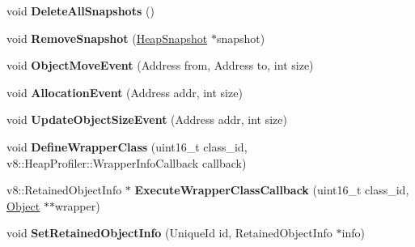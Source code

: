\begin{DoxyCompactItemize}
\item 
\hypertarget{classv8_1_1internal_1_1_heap_profiler_a95d369db8e294e4eb4d8e931d1eebf8e}{}void {\bfseries Delete\+All\+Snapshots} ()\label{classv8_1_1internal_1_1_heap_profiler_a95d369db8e294e4eb4d8e931d1eebf8e}

\item 
\hypertarget{classv8_1_1internal_1_1_heap_profiler_abe0002601a7d13e03bf48713b7e2d3a0}{}void {\bfseries Remove\+Snapshot} (\hyperlink{classv8_1_1internal_1_1_heap_snapshot}{Heap\+Snapshot} $\ast$snapshot)\label{classv8_1_1internal_1_1_heap_profiler_abe0002601a7d13e03bf48713b7e2d3a0}

\item 
\hypertarget{classv8_1_1internal_1_1_heap_profiler_aef6308a35e96bc89e13295b9f08124f4}{}void {\bfseries Object\+Move\+Event} (Address from, Address to, int size)\label{classv8_1_1internal_1_1_heap_profiler_aef6308a35e96bc89e13295b9f08124f4}

\item 
\hypertarget{classv8_1_1internal_1_1_heap_profiler_a5466f54a13dc18ab7e90d41fccd5ef2b}{}void {\bfseries Allocation\+Event} (Address addr, int size)\label{classv8_1_1internal_1_1_heap_profiler_a5466f54a13dc18ab7e90d41fccd5ef2b}

\item 
\hypertarget{classv8_1_1internal_1_1_heap_profiler_afbf0ad802eff44e4d4574a75f4aec2a5}{}void {\bfseries Update\+Object\+Size\+Event} (Address addr, int size)\label{classv8_1_1internal_1_1_heap_profiler_afbf0ad802eff44e4d4574a75f4aec2a5}

\item 
\hypertarget{classv8_1_1internal_1_1_heap_profiler_a4e741b3c78bcfc59084d52ec8d0148d1}{}void {\bfseries Define\+Wrapper\+Class} (uint16\+\_\+t class\+\_\+id, v8\+::\+Heap\+Profiler\+::\+Wrapper\+Info\+Callback callback)\label{classv8_1_1internal_1_1_heap_profiler_a4e741b3c78bcfc59084d52ec8d0148d1}

\item 
\hypertarget{classv8_1_1internal_1_1_heap_profiler_a2c74f3148efb1f50112d7fc85174a1aa}{}v8\+::\+Retained\+Object\+Info $\ast$ {\bfseries Execute\+Wrapper\+Class\+Callback} (uint16\+\_\+t class\+\_\+id, \hyperlink{classv8_1_1internal_1_1_object}{Object} $\ast$$\ast$wrapper)\label{classv8_1_1internal_1_1_heap_profiler_a2c74f3148efb1f50112d7fc85174a1aa}

\item 
\hypertarget{classv8_1_1internal_1_1_heap_profiler_a4c52d185ebd72396c8dc516e57460712}{}void {\bfseries Set\+Retained\+Object\+Info} (Unique\+Id id, Retained\+Object\+Info $\ast$info)\label{classv8_1_1internal_1_1_heap_profiler_a4c52d185ebd72396c8dc516e57460712}


\end{DoxyCompactItemize}
